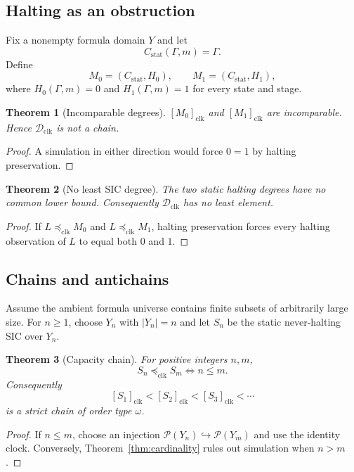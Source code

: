 \documentclass[11pt]{article}
\newtheorem{theorem}{Theorem}[section]
\theoremstyle{definition}
\newcommand{\Pow}{\mathcal{P}}
\newcommand{\Dclk}{\mathcal{D}_{\mathrm{clk}}}
\newcommand{\preclk}{\preceq_{\mathrm{clk}}}
\begin{document}
\subsection{Halting as an obstruction}
Fix a nonempty formula domain $Y$ and let
\[
C_{\mathrm{stat}}(\Gamma,m)=\Gamma.
\]
Define
\[
M_0=(C_{\mathrm{stat}},H_0),\qquad M_1=(C_{\mathrm{stat}},H_1),
\]
where $H_0(\Gamma,m)=0$ and $H_1(\Gamma,m)=1$ for every state and stage.

\begin{theorem}[Incomparable degrees]
$[M_0]_{\mathrm{clk}}$ and $[M_1]_{\mathrm{clk}}$ are incomparable. Hence $\Dclk$ is not a chain.
\end{theorem}

\begin{proof}
A simulation in either direction would force $0=1$ by halting preservation.
\end{proof}

\begin{theorem}[No least SIC degree]\label{thm:nolower}
The two static halting degrees have no common lower bound. Consequently $\Dclk$ has no least element.
\end{theorem}

\begin{proof}
If $L\preclk M_0$ and $L\preclk M_1$, halting preservation forces every halting observation of $L$ to equal both $0$ and $1$.
\end{proof}

\subsection{Chains and antichains}
Assume the ambient formula universe contains finite subsets of arbitrarily large size. For $n\ge1$, choose $Y_n$ with $|Y_n|=n$ and let $S_n$ be the static never-halting SIC over $Y_n$.

\begin{theorem}[Capacity chain]
For positive integers $n,m$,
\[
S_n\preclk S_m\Longleftrightarrow n\le m.
\]
Consequently
\[
[S_1]_{\mathrm{clk}}<[S_2]_{\mathrm{clk}}<[S_3]_{\mathrm{clk}}<\cdots
\]
is a strict chain of order type $\omega$.
\end{theorem}

\begin{proof}
If $n\le m$, choose an injection $\Pow(Y_n)\hookrightarrow\Pow(Y_m)$ and use the identity clock. Conversely, Theorem~\ref{thm:cardinality} rules out simulation when $n>m$.
\end{proof}
\end{document}
